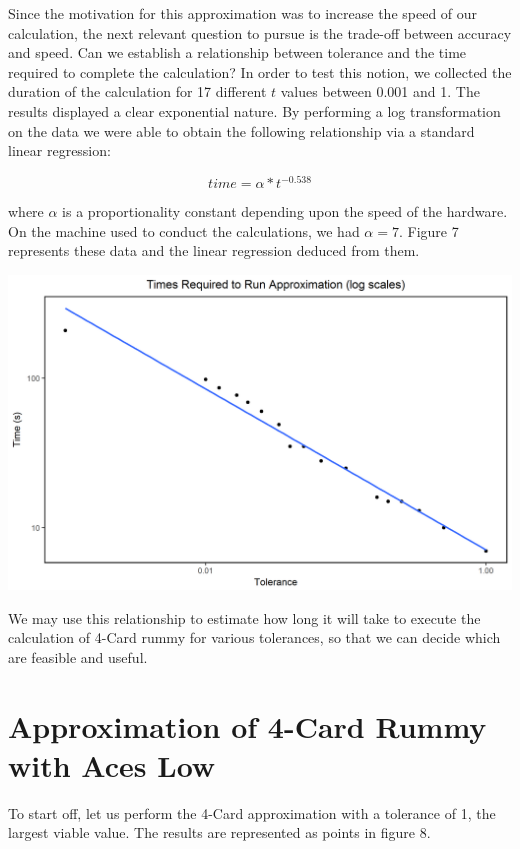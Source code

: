 \documentclass[paper=a4, fontsize=11pt,twoside]{report}   %
\begin{document}
Since the motivation for this approximation was to increase the speed of our calculation, the next relevant question to pursue is the trade-off between accuracy and speed. Can we establish a relationship between tolerance and the time required to complete the calculation? In order to test this notion, we collected the duration of the calculation for 17 different $t$ values between 0.001 and 1. The results displayed a clear exponential nature. By performing a log transformation on the data we were able to obtain the following relationship via a standard linear regression:

$$time = \alpha * t^{-0.538}$$

where $\alpha$ is a proportionality constant depending upon the speed of the hardware. On the machine used to conduct the calculations, we had $\alpha = 7$. Figure 7 represents these data and the linear regression deduced from them.

\smallskip
\includegraphics[width=\textwidth]{fig7.png}

We may use this relationship to estimate how long it will take to execute the calculation of 4-Card rummy for various tolerances, so that we can decide which are feasible and useful.

\section{Approximation of 4-Card Rummy with Aces Low}

To start off, let us perform the 4-Card approximation with a tolerance of 1, the largest viable value. The results are represented as points in figure 8.
\end{document}
